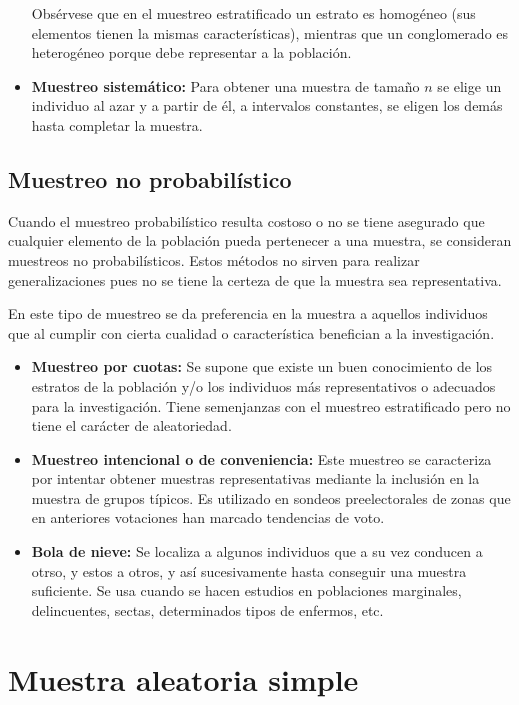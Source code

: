 \begin{itemize}
          Obsérvese que en el muestreo estratificado un estrato es homogéneo (sus elementos tienen la mismas características), mientras que un conglomerado es heterogéneo porque debe representar a la población.
    \item \textbf{Muestreo sistemático:} Para obtener una muestra de tamaño $n$ se elige un individuo al azar y a partir de él, a intervalos constantes, se eligen los demás hasta completar la muestra.
\end{itemize}

\subsection{Muestreo no probabilístico}
Cuando el muestreo probabilístico resulta costoso o no se tiene asegurado que cualquier elemento de la población pueda pertenecer a una muestra, se consideran muestreos no probabilísticos. Estos métodos no sirven para realizar generalizaciones pues no se tiene la certeza de que la muestra sea representativa.

En este tipo de muestreo se da preferencia en la muestra a aquellos individuos que al cumplir con cierta cualidad o característica benefician a la investigación.
\begin{itemize}
    \item \textbf{Muestreo por cuotas:} Se supone que existe un buen conocimiento de los estratos de la población y/o los individuos más representativos o adecuados para la investigación. Tiene semenjanzas con el muestreo estratificado pero no tiene el carácter de aleatoriedad.
    \item \textbf{Muestreo intencional o de conveniencia:} Este muestreo se caracteriza por intentar obtener muestras representativas mediante la inclusión en la muestra de grupos típicos. Es utilizado en sondeos preelectorales de zonas que en anteriores votaciones han marcado tendencias de voto.
    \item \textbf{Bola de nieve: } Se localiza a algunos individuos que a su vez conducen a otrso, y estos a otros, y así sucesivamente hasta conseguir una muestra suficiente. Se usa cuando se hacen estudios en poblaciones marginales, delincuentes, sectas, determinados tipos de enfermos, etc.
\end{itemize}

\section{Muestra aleatoria simple}

